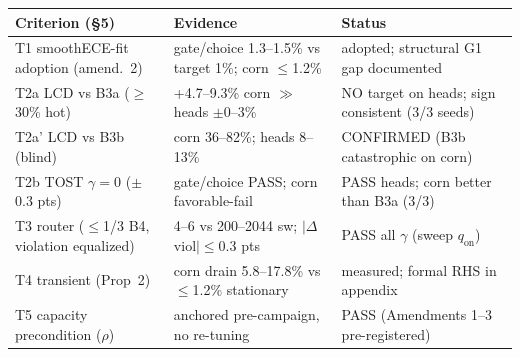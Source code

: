 \begin{tabular}{p{5.2cm}p{5.4cm}p{5.0cm}}
\toprule
Criterion (§5) & Evidence & Status \\
\midrule
T1 smoothECE-fit adoption (amend.\ 2) & gate/choice 1.3--1.5\% vs target 1\%; corn $\le$1.2\% & adopted; structural G1 gap documented \\
T2a LCD vs B3a ($\ge$30\% hot) & +4.7--9.3\% corn $\gg$ heads $\pm$0--3\% & NO target on heads; sign consistent (3/3 seeds) \\
T2a' LCD vs B3b (blind) & corn 36--82\%; heads 8--13\% & CONFIRMED (B3b catastrophic on corn) \\
T2b TOST $\gamma{=}0$ ($\pm$0.3 pts) & gate/choice PASS; corn favorable-fail & PASS heads; corn better than B3a (3/3) \\
T3 router ($\le$1/3 B4, violation equalized) & 4--6 vs 200--2044 sw; $|\Delta$viol$|\!\le$0.3 pts & PASS all $\gamma$ (sweep $q_{\mathrm{on}}$) \\
T4 transient (Prop\ 2) & corn drain 5.8--17.8\% vs $\le$1.2\% stationary & measured; formal RHS in appendix \\
T5 capacity precondition ($\rho$) & anchored pre-campaign, no re-tuning & PASS (Amendments 1--3 pre-registered) \\
\bottomrule
\end{tabular}
